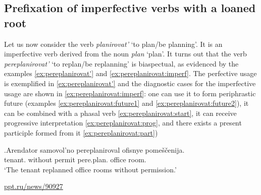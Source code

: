 
\subsection{Prefixation of imperfective verbs with a loaned root}\label{subsection:perf:imperf}
Let us now consider the verb \textit{planirovat'} `to plan/be planning'. It is an imperfective verb derived from the noun \textit{plan} `plan'. It turns out that the verb \textit{pereplanirovat'} `to replan/be replanning' is biaspectual, as evidenced by the examples \ref{ex:pereplanirovat'} and \ref{ex:pereplanirovat:imperf}. The perfective usage is exemplified in \ref{ex:pereplanirovat'} and the diagnostic cases for the imperfective usage are shown in \ref{ex:pereplanirovat:imperf}: one can use it to form periphrastic future (examples \ref{ex:pereplanirovat:future1} and \ref{ex:pereplanirovat:future2}), it can be combined with a phasal verb \ref{ex:pereplanirovat:start}, it can receive progressive interpretation \ref{ex:pereplanirovat:prog}, and there exists a present participle formed from it \ref{ex:pereplanirovat:part}) 

\exg.\label{ex:pereplanirovat'}Arendator samovol'no pereplaniroval\textsuperscript{\PF} ofisnye pome\v{s}\v{c}enija.\\
tenant. {without permit} pere.plan. office room.\\
\trans `The tenant replanned office rooms without permission.'
\begin{flushright}
\vspace{-0.5em}
\url{ppt.ru/news/90927}
\end{flushright}

